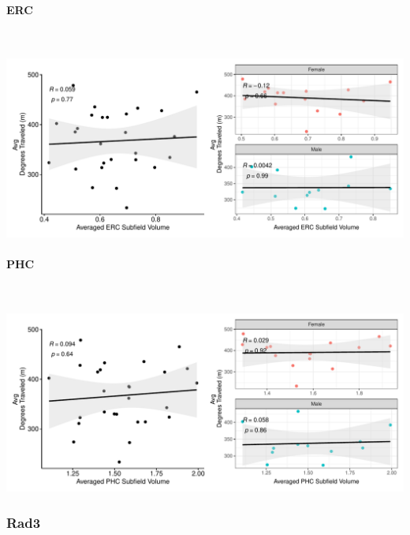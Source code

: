 \documentclass[
]{article}
\begin{document}
\paragraph{ERC}

~ \vspace{1cm}

\includegraphics{hippocampal_subfield_files/figure-latex/unnamed-chunk-18-1.pdf}

\paragraph{PHC}

~ \vspace{1cm}

\includegraphics{hippocampal_subfield_files/figure-latex/unnamed-chunk-19-1.pdf}

\subsubsection{Rad3}
\end{document}
